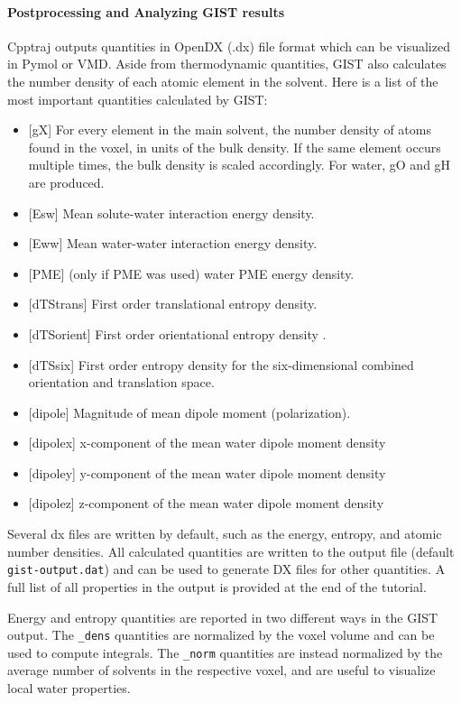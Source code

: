 \documentclass[9pt,tutorial]{livecoms}
\newcommand\inlinecode{\texttt}
\begin{document}
\paragraph{Postprocessing and Analyzing GIST results}
Cpptraj outputs quantities in OpenDX (.dx) file format which can be visualized in Pymol or VMD.
Aside from thermodynamic quantities, GIST also calculates the number density of each atomic element in the solvent.
Here is a list of the most important quantities calculated by GIST:

\begin{itemize}
	\item{[gX] For every element in the main solvent, the number density of atoms found in the voxel, in units of the bulk density. If the same element occurs multiple times, the bulk density is scaled accordingly. For water, gO and gH are produced.}
	\item{[Esw] Mean solute-water interaction energy density.}
	\item{[Eww] Mean water-water interaction energy density.}
	\item{[PME] (only if PME was used) water PME energy density.}
	\item{[dTStrans] First order translational entropy density.}
	\item{[dTSorient] First order orientational entropy density .}
	\item{[dTSsix] First order entropy density for the six-dimensional combined orientation and translation space.}
	\item{[dipole] Magnitude of mean dipole moment (polarization).}
	\item{[dipolex] x-component of the mean water dipole moment density}
	\item{[dipoley] y-component of the mean water dipole moment density}
	\item{[dipolez] z-component of the mean water dipole moment density}
\end{itemize}

Several dx files are written by default, such as the energy, entropy, and atomic number densities.
All calculated quantities are written to the output file (default \inlinecode{gist-output.dat}) and can be used to generate DX files for other quantities.
A full list of all properties in the output is provided at the end of the tutorial.

Energy and entropy quantities are reported in two different ways in the GIST output.
The \inlinecode{\_dens} quantities are normalized by the voxel volume and can be used to compute integrals.
The \inlinecode{\_norm} quantities are instead normalized by the average number of solvents in the respective voxel, and are useful to visualize local water properties.
\end{document}
